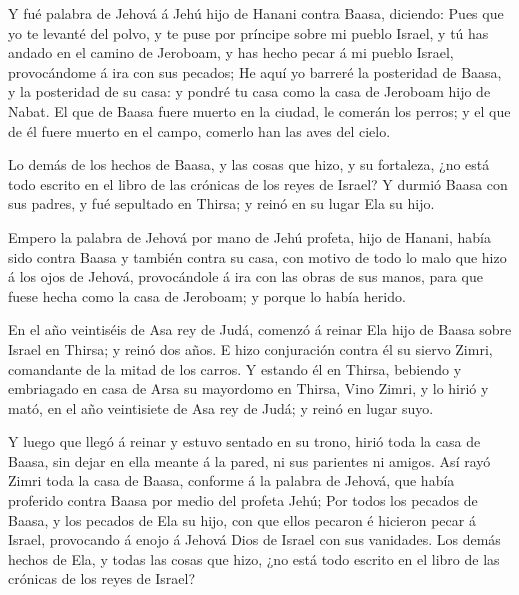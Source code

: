  Y fué palabra de Jehová á Jehú hijo de Hanani contra Baasa,
diciendo:  Pues que yo te levanté del polvo, y te puse por
príncipe sobre mi pueblo Israel, y tú has andado en el camino de
Jeroboam, y has hecho pecar á mi pueblo Israel, provocándome á ira con
sus pecados;  He aquí yo barreré la posteridad de Baasa, y
la posteridad de su casa: y pondré tu casa como la casa de Jeroboam hijo
de Nabat.  El que de Baasa fuere muerto en la ciudad, le
comerán los perros; y el que de él fuere muerto en el campo, comerlo han
las aves del cielo.

 Lo demás de los hechos de Baasa, y las cosas que hizo, y su
fortaleza, ¿no está todo escrito en el libro de las crónicas de los
reyes de Israel?  Y durmió Baasa con sus padres, y fué
sepultado en Thirsa; y reinó en su lugar Ela su hijo.

 Empero la palabra de Jehová por mano de Jehú profeta, hijo
de Hanani, había sido contra Baasa y también contra su casa, con motivo
de todo lo malo que hizo á los ojos de Jehová, provocándole á ira con
las obras de sus manos, para que fuese hecha como la casa de Jeroboam; y
porque lo había herido.

 En el año veintiséis de Asa rey de Judá, comenzó á reinar
Ela hijo de Baasa sobre Israel en Thirsa; y reinó dos años. 
E hizo conjuración contra él su siervo Zimri, comandante de la mitad de
los carros. Y estando él en Thirsa, bebiendo y embriagado en casa de
Arsa su mayordomo en Thirsa,  Vino Zimri, y lo hirió y
mató, en el año veintisiete de Asa rey de Judá; y reinó en lugar suyo.

 Y luego que llegó á reinar y estuvo sentado en su trono,
hirió toda la casa de Baasa, sin dejar en ella meante á la pared, ni sus
parientes ni amigos.  Así rayó Zimri toda la casa de Baasa,
conforme á la palabra de Jehová, que había proferido contra Baasa por
medio del profeta Jehú;  Por todos los pecados de Baasa, y
los pecados de Ela su hijo, con que ellos pecaron é hicieron pecar á
Israel, provocando á enojo á Jehová Dios de Israel con sus vanidades.
 Los demás hechos de Ela, y todas las cosas que hizo, ¿no
está todo escrito en el libro de las crónicas de los reyes de Israel?

